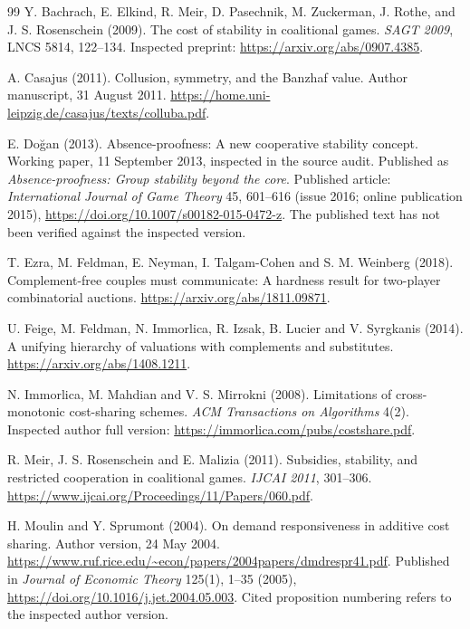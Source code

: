 \begin{thebibliography}{99}
Y. Bachrach, E. Elkind, R. Meir, D. Pasechnik, M. Zuckerman, J. Rothe,
and J. S. Rosenschein (2009).
The cost of stability in coalitional games.
\emph{SAGT 2009}, LNCS 5814, 122--134.
Inspected preprint: \url{https://arxiv.org/abs/0907.4385}.

A. Casajus (2011).
Collusion, symmetry, and the Banzhaf value.
Author manuscript, 31 August 2011.
\url{https://home.uni-leipzig.de/casajus/texts/colluba.pdf}.

E. Do\u{g}an (2013).
Absence-proofness: A new cooperative stability concept.
Working paper, 11 September 2013, inspected in the source audit.
Published as \emph{Absence-proofness: Group stability beyond the core}.
Published article: \emph{International Journal of Game Theory} 45, 601--616
(issue 2016; online publication 2015),
\url{https://doi.org/10.1007/s00182-015-0472-z}.
The published text has not been verified against the inspected version.

T. Ezra, M. Feldman, E. Neyman, I. Talgam-Cohen and S. M. Weinberg (2018).
Complement-free couples must communicate: A hardness result for two-player
combinatorial auctions. \url{https://arxiv.org/abs/1811.09871}.

U. Feige, M. Feldman, N. Immorlica, R. Izsak, B. Lucier and V. Syrgkanis (2014).
A unifying hierarchy of valuations with complements and substitutes.
\url{https://arxiv.org/abs/1408.1211}.

N. Immorlica, M. Mahdian and V. S. Mirrokni (2008).
Limitations of cross-monotonic cost-sharing schemes.
\emph{ACM Transactions on Algorithms} 4(2).
Inspected author full version: \url{https://immorlica.com/pubs/costshare.pdf}.

R. Meir, J. S. Rosenschein and E. Malizia (2011).
Subsidies, stability, and restricted cooperation in coalitional games.
\emph{IJCAI 2011}, 301--306.
\url{https://www.ijcai.org/Proceedings/11/Papers/060.pdf}.

H. Moulin and Y. Sprumont (2004).
On demand responsiveness in additive cost sharing.
Author version, 24 May 2004.
\url{https://www.ruf.rice.edu/~econ/papers/2004papers/dmdrespr41.pdf}.
Published in \emph{Journal of Economic Theory} 125(1), 1--35 (2005),
\url{https://doi.org/10.1016/j.jet.2004.05.003}.
Cited proposition numbering refers to the inspected author version.
\end{thebibliography}
